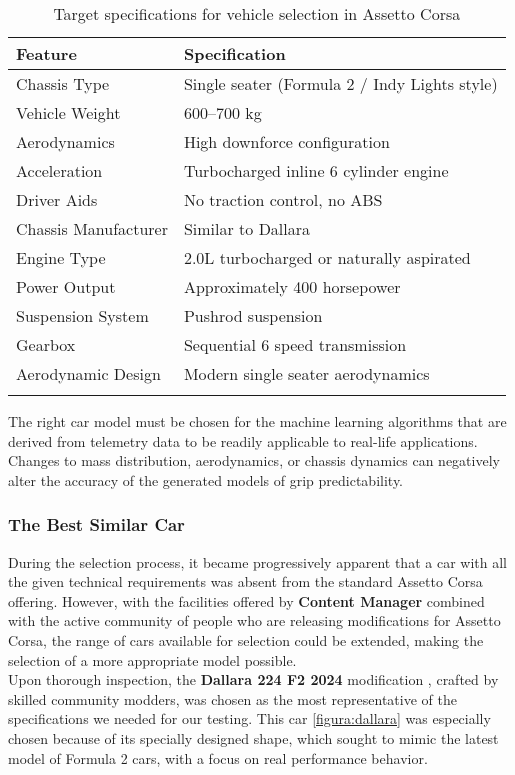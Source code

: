 \documentclass[a4paper,final,12pt]{report}
\begin{document}
\begin{longtable}{|l|l|}
\hline
\textbf{Feature} & \textbf{Specification} \\ \hline
Chassis Type & Single seater (Formula 2 / Indy Lights style) \\ \hline
Vehicle Weight & 600–700 kg \\ \hline
Aerodynamics & High downforce configuration \\ \hline
Acceleration & Turbocharged inline 6 cylinder engine \\ \hline
Driver Aids & No traction control, no ABS \\ \hline
Chassis Manufacturer & Similar to Dallara \\ \hline
Engine Type & 2.0L turbocharged or naturally aspirated \\ \hline
Power Output & Approximately 400 horsepower \\ \hline
Suspension System & Pushrod suspension \\ \hline
Gearbox & Sequential 6 speed transmission \\ \hline
Aerodynamic Design & Modern single seater aerodynamics \\ \hline
\caption{Target specifications for vehicle selection in Assetto Corsa}
\label{tab:vehicle_specifications}
\end{longtable}

The right car model must be chosen for the machine learning algorithms that are derived from telemetry data to be readily applicable to real-life applications. Changes to mass distribution, aerodynamics, or chassis dynamics can negatively alter the accuracy of the generated models of grip predictability.

\subsubsection{The Best Similar Car}
During the selection process, it became progressively apparent that a car with all the given technical requirements was absent from the standard Assetto Corsa offering. However, with the facilities offered by \textbf{Content Manager} combined with the active community of people who are releasing modifications for Assetto Corsa, the range of cars available for selection could be extended, making the selection of a more appropriate model possible.\\

Upon thorough inspection, the \textbf{Dallara 224 F2 2024} modification \cite{dallara224mod}, crafted by skilled community modders, was chosen as the most representative of the specifications we needed for our testing. This car \ref{figura:dallara} was especially chosen because of its specially designed shape, which sought to mimic the latest model of Formula 2 cars, with a focus on real performance behavior.
\end{document}
